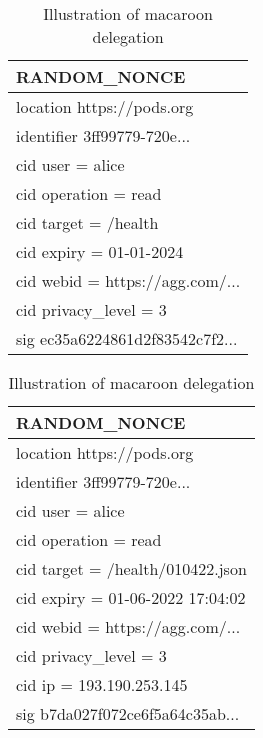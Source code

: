 \begin{table}[!htb]
   \centering
    \begin{subtable}{.4\linewidth}
      \centering
        \begin{tabular}{|l|}
        \hline
        RANDOM\_NONCE                                       \\ \hline
        location https://pods.org                           \\ \hline
        identifier 3ff99779-720e...                         \\ \hline
        cid user = alice                                    \\ \hline
        cid operation = read                                \\ \hline
        cid target = /health                                \\ \hline
        cid expiry = 01-01-2024                             \\ \hline
        cid webid = https://agg.com/...                     \\ \hline
        cid privacy\_level = 3                              \\ \hline
        sig ec35a6224861d2f83542c7f2...                     \\ \hline
        \end{tabular}
        \caption{Aggregator macaroon}
    \end{subtable}%
    \begin{subtable}{.6\linewidth}
      \centering
        \begin{tabular}{|l|}
        \hline
        RANDOM\_NONCE                                       \\ \hline
        location https://pods.org                           \\ \hline
        identifier 3ff99779-720e...                         \\ \hline
        cid user = alice                                    \\ \hline
        cid operation = read                                \\ \hline
        cid target = /health/010422.json                    \\ \hline
        cid expiry = 01-06-2022 17:04:02                    \\ \hline
        cid webid = https://agg.com/...                     \\ \hline
        cid privacy\_level = 3                              \\ \hline
        cid ip = 193.190.253.145                            \\ \hline
        sig b7da027f072ce6f5a64c35ab...                     \\ \hline
        \end{tabular}
        \caption{Derived macaroon}
    \end{subtable} 
    \caption{Illustration of macaroon delegation}
    \label{table:delegated-macaroon}
\end{table}
